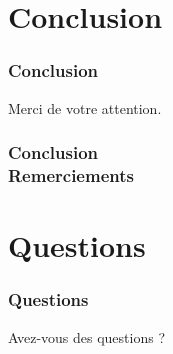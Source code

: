 \documentclass{beamer}
\begin{document}
\section{Conclusion}

\begin{frame}
    \frametitle{Conclusion}
    \begin{block}{}
        \centering
        Merci de votre attention.
    \end{block}
\end{frame}

\begin{frame}
    \frametitle{Conclusion \\
                \small Remerciements}      
    \begin{block}{}
        
    \end{block}         
\end{frame}

\section*{Questions}

\begin{frame}
    \frametitle{Questions}
    \begin{block}{}
        \centering
        Avez-vous des questions ?
    \end{block}
\end{frame}
\end{document}
